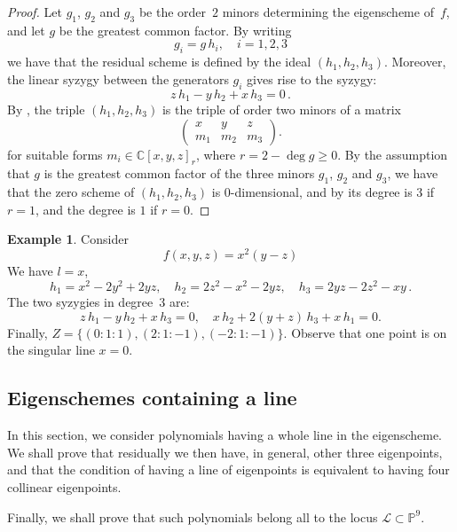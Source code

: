 \documentclass{amsart}
\theoremstyle{plain}
\theoremstyle{definition}
\newtheorem{es}[lemma]{Example}
\newcommand{\C}{\mathbb{C}}
\newcommand{\p}{\mathbb{P}}
\newcommand{\sL}{\mathcal{L}}
\begin{document}
{\begin{proof}
Let $g_1$, $g_2$ and $g_3$ be the order~$2$ minors determining the eigenscheme of~$f$, and let $g$ be the greatest common factor.
By writing
\[
 g_i = g \, h_i, \quad i=1,2,3
\]
we have that the residual scheme is defined by the ideal
$(h_1,h_2,h_3)$. Moreover, the
linear
syzygy between the generators $g_i$ gives rise to the syzygy:
\[
z\, h_1 - y\, h_2 + x\, h_3 = 0 \,.
\]
By , the triple $(h_1,h_2,h_3)$ is the triple of order two minors of a matrix
\[
\begin{pmatrix}
    x & y & z \\
    m_1 & m_2 & m_3
    \end{pmatrix}.
\]
for suitable forms $m_i \in \C[x,y,z]_r$, where $r =2 - \deg g \ge 0$. By the assumption that $g$ is the greatest common factor of the three minors $g_1$, $g_2$ and $g_3$, we have that the zero scheme of $(h_1,h_2,h_3)$ is $0$-dimensional, and 
by  its degree is $3$ if $r=1$, and the degree is $1$ if $r=0$.



\end{proof}
}

\begin{es}
Consider
\[
 f(x, y, z) = x^2 (y - z)
\]
We have $l=x$,
\[
 h_1=x^2-2y^2+2y z, \quad h_2= 2z^2-x^2-2y z, \quad h_3= 2yz-2z^2-xy \,.
\]
The two syzygies in degree~$3$ are:
\[
z \, h_1 - y \, h_2 + x \, h_3 = 0, \quad x \, h_2 + 2(y+z) \, h_3 + x \, h_1 = 0.
\]
Finally, $Z= \{ (0:1:1),(2:1:-1),(-2:1:-1) \}$. Observe that one point is on the singular line $x=0$.
\end{es}

\subsection{Eigenschemes containing a line}

In this section, we consider polynomials having a whole line in the eigenscheme. We shall prove that residually we then have, in general, other three eigenpoints, and that the condition of having a line of eigenpoints is equivalent to having four collinear eigenpoints.

Finally, we shall prove that such polynomials belong all to the locus $\sL \subset \p^9$.
\end{document}
